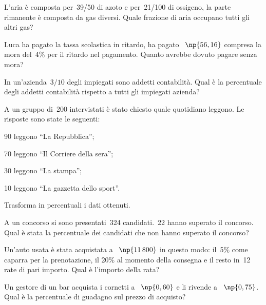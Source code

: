 \begin{multicols}{2}
\begin{esercizio}[\Ast]%
 L'aria è composta per~39/50 di azoto e per~21/100 di
ossigeno, la parte rimanente è composta da gas diversi. Quale
frazione di aria occupano tutti gli altri gas?
\end{esercizio}

\begin{esercizio}[\Ast]%
 Luca ha pagato la tassa scolastica in ritardo, ha pagato \officialeuro~$\np{56,16}$
compresa la mora del~4\% per il ritardo nel pagamento.
Quanto avrebbe dovuto pagare senza mora?
\end{esercizio}

\begin{esercizio}%
 In un'azienda~$3/10$ degli impiegati sono addetti
contabilità. Qual è la percentuale degli addetti contabilità
rispetto a tutti gli impiegati azienda?
\end{esercizio}

\begin{esercizio}%
 A un gruppo di~200 intervistati è stato chiesto quale quotidiano
leggono. Le risposte sono state le seguenti:
\begin{itemize*}
\item 90 leggono ``La Repubblica'';
\item 70 leggono ``Il Corriere della sera'';
\item 30 leggono ``La stampa'';
\item 10 leggono ``La gazzetta dello sport''.
\end{itemize*}
Trasforma in percentuali i dati ottenuti.
\end{esercizio}

\begin{esercizio}%
 A un concorso si sono presentati~324 candidati.~22 hanno superato il
concorso. Qual è stata la percentuale dei candidati che non hanno
superato il concorso?
\end{esercizio}

\begin{esercizio}[\Ast]%
Un'auto usata è stata acquistata a \officialeuro~$\np{11\,800}$
in questo modo: il~5\% come caparra per la prenotazione, il
20\% al momento della consegna e il resto in~12 rate di pari importo.
Qual è l'importo della rata?
\end{esercizio}

\begin{esercizio}[\Ast]%
Un gestore di un bar acquista i cornetti a \officialeuro~$\np{0,60}$ e li rivende a
\officialeuro~$\np{0,75}$. Qual è la percentuale di guadagno sul prezzo di
acquisto?
\end{esercizio}


\end{multicols}
